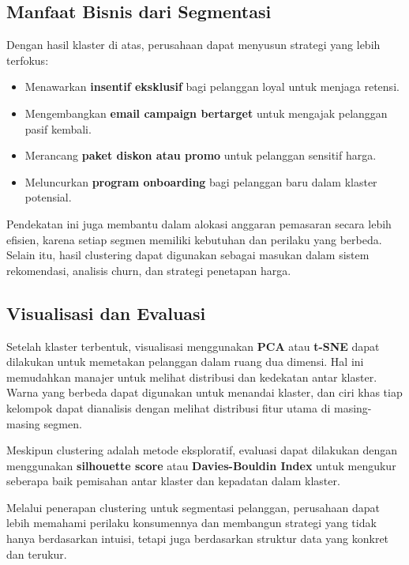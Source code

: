 \subsection*{Manfaat Bisnis dari Segmentasi}

Dengan hasil klaster di atas, perusahaan dapat menyusun strategi yang lebih terfokus:

\begin{itemize}
	\item Menawarkan \textbf{insentif eksklusif} bagi pelanggan loyal untuk menjaga retensi.
	\item Mengembangkan \textbf{email campaign bertarget} untuk mengajak pelanggan pasif kembali.
	\item Merancang \textbf{paket diskon atau promo} untuk pelanggan sensitif harga.
	\item Meluncurkan \textbf{program onboarding} bagi pelanggan baru dalam klaster potensial.
\end{itemize}

Pendekatan ini juga membantu dalam alokasi anggaran pemasaran secara lebih efisien, karena setiap segmen memiliki kebutuhan dan perilaku yang berbeda. Selain itu, hasil clustering dapat digunakan sebagai masukan dalam sistem rekomendasi, analisis churn, dan strategi penetapan harga.

\subsection*{Visualisasi dan Evaluasi}

Setelah klaster terbentuk, visualisasi menggunakan \textbf{PCA} atau \textbf{t-SNE} dapat dilakukan untuk memetakan pelanggan dalam ruang dua dimensi. Hal ini memudahkan manajer untuk melihat distribusi dan kedekatan antar klaster. Warna yang berbeda dapat digunakan untuk menandai klaster, dan ciri khas tiap kelompok dapat dianalisis dengan melihat distribusi fitur utama di masing-masing segmen.

Meskipun clustering adalah metode eksploratif, evaluasi dapat dilakukan dengan menggunakan \textbf{silhouette score} atau \textbf{Davies-Bouldin Index} untuk mengukur seberapa baik pemisahan antar klaster dan kepadatan dalam klaster.

Melalui penerapan clustering untuk segmentasi pelanggan, perusahaan dapat lebih memahami perilaku konsumennya dan membangun strategi yang tidak hanya berdasarkan intuisi, tetapi juga berdasarkan struktur data yang konkret dan terukur.



